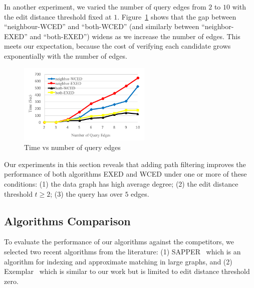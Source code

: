 \documentclass{sigmod}
\begin{document}
 In another experiment, we varied the number of query edges from $2$ to $10$ with the edit distance threshold fixed at $1$. Figure~\ref{fig:edgenumber} shows that the gap between ``neighbour-WCED'' and ``both-WCED'' (and similarly between ``neighbor-EXED'' and ``both-EXED'') widens as we increase the number of edges. This meets our expectation, because the cost of verifying each candidate grows exponentially with the number of edges. 
\begin{figure}[htbp] 
\setlength{\abovecaptionskip}{-0.5\baselineskip}
\setlength{\belowcaptionskip}{-0.5\baselineskip}
\centering\includegraphics[width=2.5in]{edgenumber.pdf} 
\caption{Time vs number of query edges}
\label{fig:edgenumber}
\end{figure}

Our experiments in this section reveals that adding path filtering improves the performance of both algorithms EXED and WCED under one or more of these conditions: (1) the data graph has high average degree; (2) the edit distance threshold $t \geq 2$; (3) the query has over $5$ edges. 

\subsection{Algorithms Comparison}
\label{sec:comp}
To evaluate the performance of our algorithms against the competitors, we selected two recent algorithms from the literature: (1) SAPPER~\cite{zhang2010sapper} which is an algorithm for indexing and approximate matching in large graphs, and (2) Exemplar~\cite{mottin2014exemplar} which is similar to our work but is limited to edit distance threshold zero.  
\end{document}
